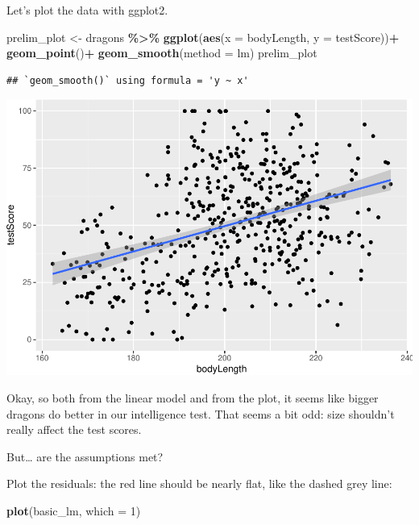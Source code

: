 \documentclass[
]{article}
\newenvironment{Shaded}{\begin{snugshade}}{\end{snugshade}}
\newcommand{\AttributeTok}[1]{\textcolor[rgb]{0.13,0.29,0.53}{#1}}
\newcommand{\DecValTok}[1]{\textcolor[rgb]{0.00,0.00,0.81}{#1}}
\newcommand{\FunctionTok}[1]{\textcolor[rgb]{0.13,0.29,0.53}{\textbf{#1}}}
\newcommand{\NormalTok}[1]{#1}
\newcommand{\OtherTok}[1]{\textcolor[rgb]{0.56,0.35,0.01}{#1}}
\newcommand{\SpecialCharTok}[1]{\textcolor[rgb]{0.81,0.36,0.00}{\textbf{#1}}}
\newcommand{\StringTok}[1]{\textcolor[rgb]{0.31,0.60,0.02}{#1}}
\begin{document}
Let's plot the data with ggplot2.

\begin{Shaded}
\begin{Highlighting}[]
\NormalTok{prelim\_plot }\OtherTok{\textless{}{-}}\NormalTok{ dragons }\SpecialCharTok{\%\textgreater{}\%} 
  \FunctionTok{ggplot}\NormalTok{(}\FunctionTok{aes}\NormalTok{(}\AttributeTok{x =}\NormalTok{ bodyLength, }\AttributeTok{y =}\NormalTok{ testScore))}\SpecialCharTok{+}
  \FunctionTok{geom\_point}\NormalTok{()}\SpecialCharTok{+}
  \FunctionTok{geom\_smooth}\NormalTok{(}\AttributeTok{method =} \StringTok{\textquotesingle{}lm\textquotesingle{}}\NormalTok{)}
\NormalTok{prelim\_plot}
\end{Highlighting}
\end{Shaded}

\begin{verbatim}
## `geom_smooth()` using formula = 'y ~ x'
\end{verbatim}

\begin{center}\includegraphics{Introduction-to-linear-mixed-models_files/figure-latex/unnamed-chunk-5-1} \end{center}

Okay, so both from the linear model and from the plot, it seems like
bigger dragons do better in our intelligence test. That seems a bit odd:
size shouldn't really affect the test scores.

But\ldots{} are the assumptions met?

Plot the residuals: the red line should be nearly flat, like the dashed
grey line:

\begin{Shaded}
\begin{Highlighting}[]
\FunctionTok{plot}\NormalTok{(basic\_lm, }\AttributeTok{which =} \DecValTok{1}\NormalTok{)}
\end{Highlighting}
\end{Shaded}
\end{document}

